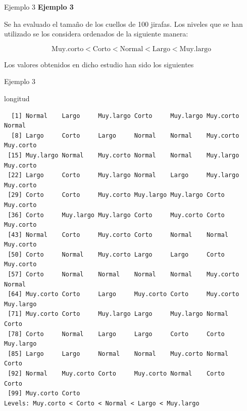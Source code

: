 \documentclass[
  ignorenonframetext,
  aspectratio=169]{beamer}
\newenvironment{Shaded}{\begin{snugshade}}{\end{snugshade}}
\newcommand{\NormalTok}[1]{#1}
\begin{document}
\begin{frame}{Ejemplo 3}
\label{ejemplo-3}
\textbf{Ejemplo 3}

Se ha evaluado el tamaño de los cuellos de 100 jirafas. Los niveles que
se han utilizado se los considera ordenados de la siguiente manera:

\[\text{Muy.corto}<\text{Corto}<\text{Normal}<\text{Largo}<\text{Muy.largo}\]

Los valores obtenidos en dicho estudio han sido los siguientes
\end{frame}

\begin{frame}[fragile]{Ejemplo 3}
\label{ejemplo-3-1}
\begin{Shaded}
\begin{Highlighting}[]
\NormalTok{longitud}
\end{Highlighting}
\end{Shaded}

\begin{verbatim}
  [1] Normal    Largo     Muy.largo Corto     Muy.largo Muy.corto Normal   
  [8] Largo     Corto     Largo     Normal    Normal    Muy.corto Muy.corto
 [15] Muy.largo Normal    Muy.corto Normal    Normal    Muy.largo Muy.corto
 [22] Largo     Corto     Muy.largo Normal    Largo     Muy.largo Muy.corto
 [29] Corto     Corto     Muy.corto Muy.largo Muy.largo Corto     Muy.corto
 [36] Corto     Muy.largo Muy.largo Corto     Muy.corto Corto     Muy.corto
 [43] Normal    Corto     Muy.corto Corto     Normal    Normal    Muy.corto
 [50] Corto     Normal    Muy.corto Largo     Largo     Corto     Muy.corto
 [57] Corto     Normal    Normal    Normal    Normal    Muy.corto Normal   
 [64] Muy.corto Corto     Largo     Muy.corto Corto     Muy.corto Muy.largo
 [71] Muy.corto Corto     Muy.largo Largo     Muy.largo Normal    Corto    
 [78] Corto     Normal    Largo     Largo     Corto     Corto     Muy.largo
 [85] Largo     Largo     Normal    Normal    Muy.corto Normal    Corto    
 [92] Normal    Muy.corto Corto     Muy.corto Normal    Corto     Corto    
 [99] Muy.corto Corto    
Levels: Muy.corto < Corto < Normal < Largo < Muy.largo
\end{verbatim}
\end{frame}
\end{document}
